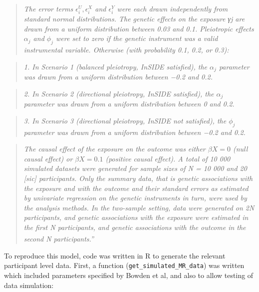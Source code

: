 \documentclass[
]{article}
\begin{document}
\begin{quote}
\emph{The error terms \(\epsilon_i^U , \epsilon_i^X\) and \(\epsilon_i^Y\) were each drawn independently from standard normal distributions. The genetic effects on the exposure γj are drawn from a uniform distribution between 0.03 and 0.1. Pleiotropic effects \(\alpha_j\) and \(\phi_j\) were set to zero if the genetic instrument was a valid instrumental variable. Otherwise (with probability 0.1, 0.2, or 0.3):}
\end{quote}

\begin{quote}
\emph{1. In Scenario 1 (balanced pleiotropy, InSIDE satisfied), the \(\alpha_j\) parameter was drawn from a uniform distribution between −0.2 and 0.2.}
\end{quote}

\begin{quote}
\emph{2. In Scenario 2 (directional pleiotropy, InSIDE satisfied), the \(\alpha_j\) parameter was drawn from a uniform distribution between 0 and 0.2.}
\end{quote}

\begin{quote}
\emph{3. In Scenario 3 (directional pleiotropy, InSIDE not satisfied), the \(\phi_j\) parameter was drawn from a uniform distribution between −0.2 and 0.2.}
\end{quote}

\begin{quote}
\emph{The causal effect of the exposure on the outcome was either \(\beta X = 0\) (null causal effect) or \(\beta X = 0.1\) (positive causal effect). A total of 10 000 simulated datasets were generated for sample sizes of N = 10 000 and 20 {[}sic{]} participants. Only the summary data, that is genetic associations with the exposure and with the outcome and their standard errors as estimated by univariate regression on the genetic instruments in turn, were used by the analysis methods. In the two-sample setting, data were generated on 2N participants, and genetic associations with the exposure were estimated in the first N participants, and genetic associations with the outcome in the second N participants.''}\textsuperscript{}
\end{quote}

To reproduce this model, code was written in R to generate the relevant participant level data. First, a function (\texttt{get\_simulated\_MR\_data}) was written which included parameters specified by Bowden et al, and also to allow testing of data simulation:
\end{document}

